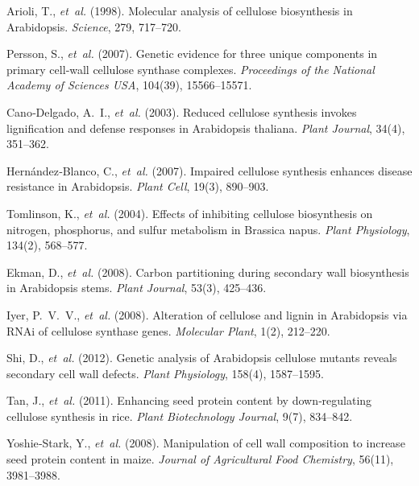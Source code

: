 \documentclass[10pt,letterpaper]{article}
\begin{document}
\begin{itemize}
\begin{thebibliography}{10}
Arioli, T., \emph{et~al.} (1998).  
Molecular analysis of cellulose biosynthesis in Arabidopsis.  
\emph{Science}, 279, 717–720.

Persson, S., \emph{et~al.} (2007).  
Genetic evidence for three unique components in primary cell‐wall cellulose synthase complexes.  
\emph{Proceedings of the National Academy of Sciences USA}, 104(39), 15566–15571.

Cano‐Delgado, A.~I., \emph{et~al.} (2003).  
Reduced cellulose synthesis invokes lignification and defense responses in Arabidopsis thaliana.  
\emph{Plant Journal}, 34(4), 351–362.

Hernández‐Blanco, C., \emph{et~al.} (2007).  
Impaired cellulose synthesis enhances disease resistance in Arabidopsis.  
\emph{Plant Cell}, 19(3), 890–903.

Tomlinson, K., \emph{et~al.} (2004).  
Effects of inhibiting cellulose biosynthesis on nitrogen, phosphorus, and sulfur metabolism in Brassica napus.  
\emph{Plant Physiology}, 134(2), 568–577.

Ekman, D., \emph{et~al.} (2008).  
Carbon partitioning during secondary wall biosynthesis in Arabidopsis stems.  
\emph{Plant Journal}, 53(3), 425–436.

Iyer, P.~V.~V., \emph{et~al.} (2008).  
Alteration of cellulose and lignin in Arabidopsis via RNAi of cellulose synthase genes.  
\emph{Molecular Plant}, 1(2), 212–220.

Shi, D., \emph{et~al.} (2012).  
Genetic analysis of Arabidopsis cellulose mutants reveals secondary cell wall defects.  
\emph{Plant Physiology}, 158(4), 1587–1595.

Tan, J., \emph{et~al.} (2011).  
Enhancing seed protein content by down‐regulating cellulose synthesis in rice.  
\emph{Plant Biotechnology Journal}, 9(7), 834–842.

Yoshie‐Stark, Y., \emph{et~al.} (2008).  
Manipulation of cell wall composition to increase seed protein content in maize.  
\emph{Journal of Agricultural Food Chemistry}, 56(11), 3981–3988.


\end{thebibliography}
\end{itemize}
\end{document}

